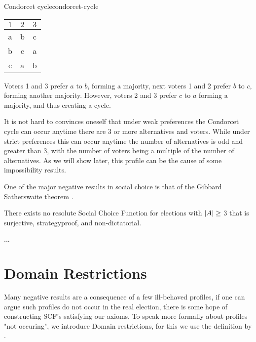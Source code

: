 \begin{example}{Condorcet cycle}{condorcet-cycle}
	\begin{minipage}{0.15\linewidth}
		\begin{tabular}{ccc}
			\toprule
			$1$ & $2$ & $3$ \\
			\midrule
			a   & b   & c   \\
			b   & c   & a   \\
			c   & a   & b   \\
			\bottomrule
		\end{tabular}
	\end{minipage}
	\hspace{0.02\linewidth}
	\begin{minipage}{0.78\linewidth}
		Voters 1 and 3  prefer $a$ to $b$, forming a majority, next voters 1 and 2 prefer $b$ to $c$, forming another majority. However, voters 2 and 3 prefer $c$ to $a$ forming a majority, and thus creating a cycle.
	\end{minipage}
\end{example}

It is not hard to convinces oneself that under weak preferences the Condorcet cycle can occur anytime there are 3 or more alternatives and voters. While under strict preferences this can occur anytime the number of alternatives is odd and greater than 3, with the number of voters being a multiple of the number of alternatives. As we will show later, this profile can be the cause of some impossibility results.

One of the major negative results in social choice is that of the Gibbard Satherswaite theorem \citep{gibbardManipulationVotingSchemes1973,satterthwaiteStrategyproofnessArrowsConditions1975}.

\begin{theorem}
	There exists no resolute Social Choice Function for elections with $|A| \geq$ 3 that is surjective, strategyproof, and non-dictatorial.
\end{theorem}

\begin{proofc}
	...
\end{proofc}

\section{Domain Restrictions}
\label{sec: Domain-res}
Many negative results are a consequence of a few ill-behaved profiles, if one can argue such profiles do not occur in the real election, there is some hope of constructing SCF's satisfying our axioms. To speak more formally about profiles "not occuring", we introduce Domain restrictions, for this we use the definition by \citet{elkindPreferenceRestrictionsComputational2022a}.

